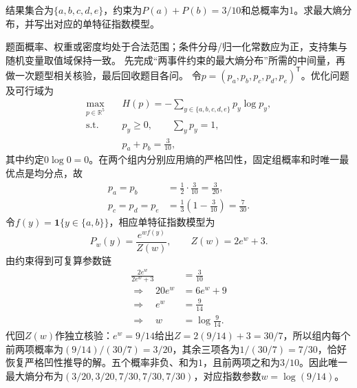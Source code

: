 \label{struct:V3-C01-CH18}
\label{struct:V3-C01-CH32}
\begin{example}[两事件约束的最大熵分布]\label{exm:V3-C01-two-groups}
结果集合为$\{a,b,c,d,e\}$，约束为$P(a)+P(b)=3/10$和总概率为1。求最大熵分布，并写出对应的单特征指数模型。

\label{struct:V3-C01-CH33}
\end{example}
\begin{solution}
\SolGiven 题面概率、权重或密度均处于合法范围；条件分母/归一化常数应为正，支持集与随机变量取值域保持一致。
\SolPlan 先完成“两事件约束的最大熵分布”所需的中间量，再做一次题型相关核验，最后回收题目各问。
\SolDerive
令$p=(p_a,p_b,p_c,p_d,p_e)^{\mathsf T}$。优化问题及可行域为
\[
\begin{aligned}
\max_{p\in\mathbb R^5}\quad
&H(p)=-\sum_{y\in\{a,b,c,d,e\}}p_y\log p_y,\\
\text{s.t.}\quad
&p_y\geq0,\qquad \sum_y p_y=1,\\
&p_a+p_b=\frac{3}{10},
\end{aligned}
\]
其中约定$0\log0=0$。在两个组内分别应用熵的严格凹性，固定组概率和时唯一最优点是均分点，故
\[
\begin{aligned}
p_a=p_b&=\frac12\cdot\frac{3}{10}=\frac{3}{20},\\
p_c=p_d=p_e&=\frac13\left(1-\frac{3}{10}\right)=\frac{7}{30}.
\end{aligned}
\]
令$f(y)=\mathbf1\{y\in\{a,b\}\}$，相应单特征指数模型为
\[
P_w(y)=\frac{e^{wf(y)}}{Z(w)},
\qquad
Z(w)=2e^w+3.
\]
由约束得到可复算参数链
\[
\begin{aligned}
\frac{2e^w}{2e^w+3}&=\frac{3}{10}\\
\Longrightarrow\quad 20e^w&=6e^w+9\\
\Longrightarrow\quad e^w&=\frac{9}{14}\\
\Longrightarrow\quad w&=\log\frac{9}{14}.
\end{aligned}
\]
代回$Z(w)$作独立核验：$e^w=9/14$给出$Z=2(9/14)+3=30/7$，所以组内每个前两项概率为$(9/14)/(30/7)=3/20$，其余三项各为$1/(30/7)=7/30$，恰好恢复严格凹性推导的解。五个概率非负、和为$1$，且前两项之和为$3/10$。因此唯一最大熵分布为$(3/20,3/20,7/30,7/30,7/30)$，对应指数参数$w=\log(9/14)$。
\end{solution}

